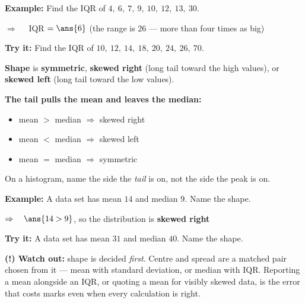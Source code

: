 \documentclass[12pt]{article}
\begin{document}
\begin{examplebox}
\textbf{Example:} \quad Find the IQR of $4,\ 6,\ 7,\ 9,\ 10,\ 12,\ 13,\ 30$.

$\Rightarrow\quad$ IQR $= \ans{6}$ \quad (the range is $26$ --- more than four times as big)
\end{examplebox}

\begin{tryitbox}
\textbf{Try it:} \quad Find the IQR of $10,\ 12,\ 14,\ 18,\ 20,\ 24,\ 26,\ 70$.\\[2pt]
\end{tryitbox}


\begin{formulabox}
\textbf{Shape} is \textbf{symmetric}, \textbf{skewed right} (long tail toward the high
values), or \textbf{skewed left} (long tail toward the low values).\par
\smallskip
\textbf{The tail pulls the mean and leaves the median:}
\begin{itemize}[label={$\bullet$}, leftmargin=1.1cm, itemsep=1pt, topsep=2pt]
  \item mean $>$ median $\Rightarrow$ skewed right
  \item mean $<$ median $\Rightarrow$ skewed left
  \item mean $=$ median $\Rightarrow$ symmetric
\end{itemize}
On a histogram, name the side the \emph{tail} is on, not the side the peak is on.
\end{formulabox}

\begin{examplebox}
\textbf{Example:} \quad A data set has mean $14$ and median $9$. Name the shape.

$\Rightarrow\quad \ans{14 > 9}$, so the distribution is \textbf{skewed right}
\end{examplebox}

\begin{tryitbox}
\textbf{Try it:} \quad A data set has mean $31$ and median $40$. Name the shape.\\[2pt]
\end{tryitbox}

\begin{watchoutbox}
\textbf{(!) Watch out:} shape is decided \emph{first}. Centre and spread are a matched pair
chosen from it --- mean with standard deviation, or median with IQR. Reporting a mean
alongside an IQR, or quoting a mean for visibly skewed data, is the error that costs marks
even when every calculation is right.
\end{watchoutbox}
\end{document}
